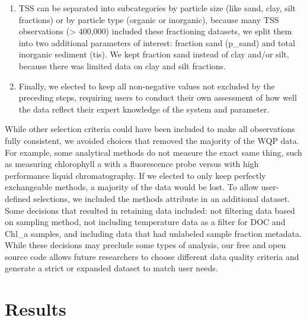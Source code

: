 \documentclass[draft,linenumbers]{agujournal2018}
\begin{document}
\begin{enumerate}
\item
  TSS can be separated into subcategories by particle size (like sand,
  clay, silt fractions) or by particle type (organic or inorganic),
  because many TSS observations (\textgreater{} 400,000) included these
  fractioning datasets, we split them into two additional parameters of
  interest: fraction sand (p\_sand) and total inorganic sediment (tis).
  We kept fraction sand instead of clay and/or silt, because there was
  limited data on clay and silt fractions.
\item
  Finally, we elected to keep all non-negative values not excluded by
  the preceding steps, requiring users to conduct their own assessment
  of how well the data reflect their expert knowledge of the system and
  parameter.
\end{enumerate}

While other selection criteria could have been included to make all
observations fully consistent, we avoided choices that removed the
majority of the WQP data. For example, some analytical methods do not
measure the exact same thing, such as measuring chlorophyll a with a
fluorescence probe versus with high performance liquid chromatography.
If we elected to only keep perfectly exchangeable methods, a majority of
the data would be lost. To allow user-defined selections, we included
the methods attribute in an additional dataset. Some decisions that
resulted in retaining data included: not filtering data based on
sampling method, not including temperature data as a filter for DOC and
Chl\_a samples, and including data that had unlabeled sample fraction
metadata. While these decisions may preclude some types of analysis, our
free and open source code allows future researchers to choose different
data quality criteria and generate a strict or expanded dataset to match
user needs.

\section{Results}
\end{document}
